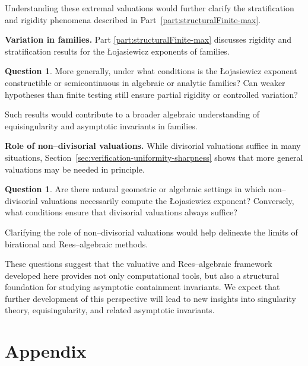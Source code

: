 \documentclass[12pt]{amsart}
\theoremstyle{plain}
\theoremstyle{definition}
\newtheorem{question}[theorem]{Question}
\numberwithin{equation}{section}
\begin{document}
Understanding these extremal valuations would further clarify the stratification and
rigidity phenomena described in Part~\ref{part:structuralFinite-max}.

\medskip

\noindent
\textbf{Variation in families.}
Part \ref{part:structuralFinite-max} discusses rigidity and stratification results for the \L{}ojasiewicz exponents of families.

\begin{question}
	More generally, under what conditions is the \L{}ojasiewicz exponent constructible or
	semicontinuous in algebraic or analytic families?  Can weaker hypotheses than finite testing
	still ensure partial rigidity or controlled variation?
\end{question}

Such results would contribute to a broader algebraic understanding of equisingularity and
asymptotic invariants in families.

\medskip

\noindent
\textbf{Role of non--divisorial valuations.}
While divisorial valuations suffice in many situations, Section~\ref{sec:verification-uniformity-sharpness}
shows that more general valuations may be needed in principle.

\begin{question}
	Are there natural geometric or algebraic settings in which non--divisorial valuations
	necessarily compute the \L{}ojasiewicz exponent?  Conversely, what conditions ensure that
	divisorial valuations always suffice?
\end{question}

Clarifying the role of non--divisorial valuations would help delineate the limits of
birational and Rees--algebraic methods.

\medskip

These questions suggest that the valuative and Rees--algebraic framework developed here
provides not only computational tools, but also a structural foundation for studying
asymptotic containment invariants.  We expect that further development of this perspective
will lead to new insights into singularity theory, equisingularity, and related asymptotic
invariants.


\section*{Appendix} \label{sec:appendix}
\end{document}
